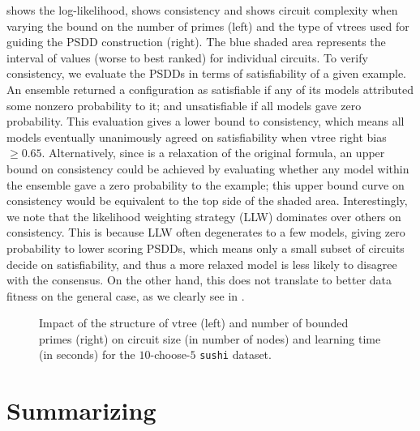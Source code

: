  shows the log-likelihood,  shows consistency and
 shows circuit complexity when varying the bound on the number of primes
(left) and the type of vtrees used for guiding the PSDD construction (right). The blue shaded area
represents the interval of values (worse to best ranked) for individual circuits. To verify
consistency, we evaluate the PSDDs in terms of satisfiability of a given example. An ensemble
returned a configuration as satisfiable if any of its models attributed some nonzero probability to
it; and unsatisfiable if all models gave zero probability. This evaluation gives a lower bound to
consistency, which means all models eventually unanimously agreed on satisfiability when vtree
right bias $\geq 0.65$. Alternatively, since  is a relaxation of the original
formula, an upper bound on consistency could be achieved by evaluating whether any model within the
ensemble gave a zero probability to the example; this upper bound curve on consistency would be
equivalent to the top side of the shaded area. Interestingly, we note that the likelihood weighting
strategy (LLW) dominates over others on consistency. This is because LLW often degenerates to a few
models, giving zero probability to lower scoring PSDDs, which means only a small subset of circuits
decide on satisfiability, and thus a more relaxed model is less likely to disagree with the
consensus. On the other hand, this does not translate to better data fitness on the general case,
as we clearly see in .

\begin{figure}[t]
  \begin{subfigure}{0.495\textwidth}
    \caption{}
  \end{subfigure}
  \begin{subfigure}{0.495\textwidth}
    \caption{}
  \end{subfigure}
  \caption{Impact of the structure of vtree (left) and number of bounded primes (right) on circuit
    size (in number of nodes) and learning time (in seconds) for the $10$-choose-$5$ \texttt{sushi}
    dataset.}
  \label{fig:compl-comp}
\end{figure}

\section{Summarizing }

